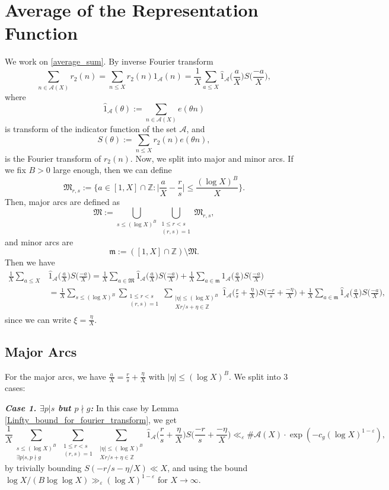 \documentclass[12pt]{amsart}
\theoremstyle{definition}
\theoremstyle{definition}
\theoremstyle{remark}
\numberwithin{equation}{section}
\newcommand{\Z}{\mathbb{Z}}
\newcommand{\CA}{\mathcal{A}}
\newcommand{\M}{\mathfrak{M}}
\newcommand{\m}{\mathfrak{m}}
\renewcommand{\leq}{\leqslant}
\renewcommand{\hat}{\widehat}
\begin{document}
\section{Average of the Representation Function}\label{average_section}
We work on \eqref{average_sum}. By inverse Fourier transform
$$ \sum_{n\in \CA(X)} r_2(n) = \sum_{n\leq X} r_2(n) 1_{\CA}(n) = \frac{1}{X} \sum_{a\leq X} \hat{1}_{\CA}\bigg(\frac{a}{X}\bigg) S\bigg(\frac{-a}{X}\bigg), $$
where
$$ \hat{1}_{\CA}(\theta):=\sum_{n\in \CA(X)} e(\theta n) $$
is transform of the indicator function of the set $\CA$, and
$$ S(\theta):=\sum_{n\leq X} r_2(n) e(\theta n), $$
is the Fourier transform of $r_2(n)$.
Now, we split into major and minor arcs. If we fix $B>0$ large enough, then we can define
$$ \M_{r,s} := \bigg\{ a \in [1,X]\cap \Z : \bigg|\frac{a}{X} - \frac{r}{s} \bigg| \leq \frac{(\log X)^B}{X} \bigg\} . $$
Then, major arcs are defined as
$$ \M := \bigcup_{s\leq (\log X)^B} \bigcup_{\substack{1\leq r <s \\ (r,s)=1}} \M_{r,s}, $$
and minor arcs are
$$ \m := ([1,X]\cap \Z)\setminus \M. $$
Then we have
\begin{align*}
 \frac{1}{X} \sum_{a\leq X} &\hat{1}_{\CA}\bigg(\frac{a}{X}\bigg) S\bigg(\frac{-a}{X}\bigg) = \frac{1}{X} \sum_{a\in \M} \hat{1}_{\CA}\bigg(\frac{a}{X}\bigg) S\bigg(\frac{-a}{X}\bigg)  +  \frac{1}{X} \sum_{a\in \m} \hat{1}_{\CA}\bigg(\frac{a}{X}\bigg) S\bigg(\frac{-a}{X}\bigg) \\
&= \frac{1}{X} \sum_{s\leq (\log X)^B} \sum_{\substack{1\leq r < s \\ (r,s)=1}} \sum_{\substack{|\eta|\leq (\log X)^B \\ Xr/s + \eta\in \Z}}\hat{1}_{\CA}\bigg(\frac{r}{s}+ \frac{\eta}{X}\bigg) S\bigg(\frac{-r}{s} + \frac{-\eta}{X}\bigg) + \frac{1}{X} \sum_{a\in \m} \hat{1}_{\CA}\bigg(\frac{a}{X}\bigg) S\bigg(\frac{-a}{X}\bigg)  ,
\end{align*}
since we can write $\xi=\frac{\eta}{X}$.


\subsection{Major Arcs}
For the major arcs, we have $\frac{a}{X} = \frac{r}{s} + \frac{\eta}{X}$ with $|\eta| \leq (\log X)^B$. We split into 3 cases:


\noindent \textit{\textbf{Case 1. $\exists p|s$ but $p\nmid g$:}} 
In this case by Lemma \ref{Linfty_bound_for_fourier_transform}, we get 
\begin{equation}\label{major_arc_error_case_1}
 \frac{1}{X} \sum_{\substack{s\leq (\log X)^B \\  \exists p|s, p\nmid g}} \sum_{\substack{1 \leq r <s  \\ (r,s)=1}} \sum_{\substack{|\eta|\leq (\log X)^B \\ Xr/s + \eta\in \Z}}\hat{1}_{\CA}\bigg(\frac{r}{s}+ \frac{\eta}{X}\bigg) S\bigg(\frac{-r}{s} + \frac{-\eta}{X}\bigg) \ll _{\varepsilon}\#\CA(X)\cdot \exp( - c_g (\log X)^{1-\varepsilon}) ,
\end{equation}
by trivially bounding $S(-r/s - \eta/X) \ll X$, and using the bound $\log X/(B\log\log X) \gg_{\varepsilon} (\log X)^{1-\varepsilon}$ for $X\to\infty$.
\end{document}
